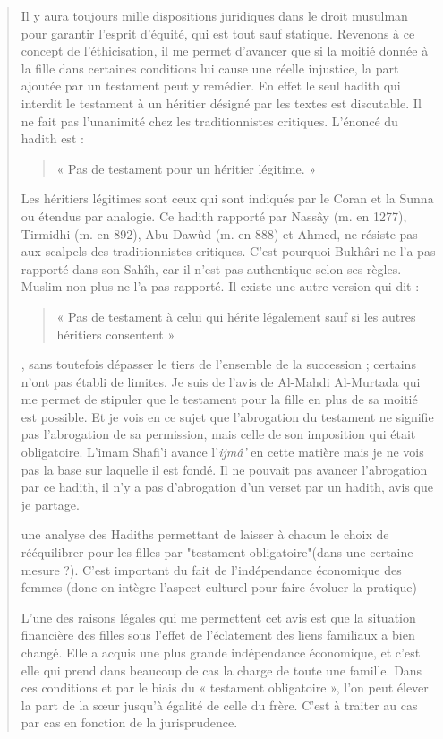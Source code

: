 \begin{quote}
Il y aura toujours mille dispositions juridiques dans
le droit musulman pour garantir l'esprit d'équité, qui
est tout sauf statique. Revenons à ce concept de l'éthicisation, il me
permet d'avancer que si la moitié donnée à la fille dans certaines
conditions lui cause une réelle injustice, la part ajoutée par un
testament peut y remédier. En effet le seul hadith qui interdit le
testament à un héritier désigné par les textes est discutable. Il ne
fait pas l'unanimité chez les traditionnistes critiques. L'énoncé du
hadith est : \begin{quote}
    « Pas de testament pour un héritier légitime. »
\end{quote} 
Les
héritiers légitimes sont ceux qui sont indiqués par le Coran et la Sunna
ou étendus par analogie. Ce hadith rapporté par Nassây (m. en 1277),
Tirmidhi (m. en 892), Abu Dawûd (m. en 888) et Ahmed, ne résiste pas aux
scalpels des traditionnistes critiques. C'est pourquoi Bukhâri ne l'a
pas rapporté dans son Sahîh, car il n'est pas authentique selon ses
règles. Muslim non plus ne l'a pas rapporté. Il existe une autre version
qui dit :
\begin{quote}
    « Pas de testament à celui qui hérite légalement sauf si les
autres héritiers consentent »
\end{quote}, sans toutefois dépasser le tiers de
l'ensemble de la succession ; certains n'ont pas établi de limites. Je
suis de l'avis de Al-Mahdi Al-Murtada qui me permet de stipuler que le
testament pour la fille en plus de sa moitié est possible. Et je vois en
ce sujet que l'abrogation du testament ne signifie pas l'abrogation de
sa permission, mais celle de son imposition qui était obligatoire.
L'imam Shafi'i avance l'\emph{ijmâ'} en cette matière mais je ne vois
pas la base sur laquelle il est fondé. Il ne pouvait pas avancer
l'abrogation par ce hadith, il n'y a pas d'abrogation d'un verset par un
hadith, avis que je
partage.
\begin{Synthesis}
 une analyse des Hadiths permettant de laisser à chacun le choix de rééquilibrer pour les filles par "testament obligatoire"(dans une certaine mesure ?). C'est important du fait de l'indépendance économique des femmes (donc on intègre l'aspect culturel pour faire évoluer la pratique)
\end{Synthesis}
L'une des raisons légales qui me permettent cet avis est que la
situation financière des filles sous l'effet de l'éclatement des liens
familiaux a bien changé. Elle a acquis une plus grande indépendance
économique, et c'est elle qui prend dans beaucoup de cas la charge de
toute une famille. Dans ces conditions et par le biais du « testament
obligatoire », l'on peut élever la part de la sœur jusqu'à égalité de
celle du frère. C'est à traiter au cas par cas en fonction de la
jurisprudence.


\end{quote}
